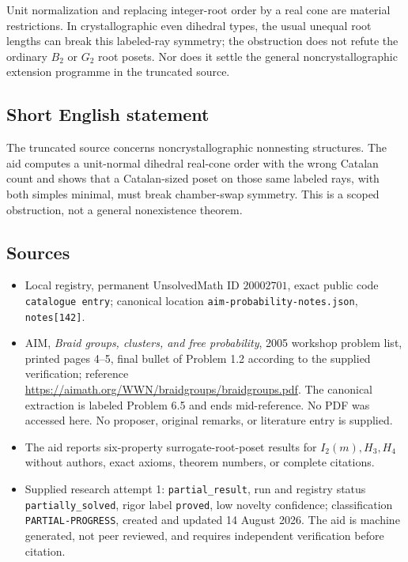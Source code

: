\documentclass[11pt]{article}
\begin{document}
Unit normalization and replacing integer-root order by a real cone are material restrictions. In crystallographic even dihedral types, the usual unequal root lengths can break this labeled-ray symmetry; the obstruction does not refute the ordinary \(B_2\) or \(G_2\) root posets. Nor does it settle the general noncrystallographic extension programme in the truncated source.
\subsection{Short English statement}
The truncated source concerns noncrystallographic nonnesting structures. The aid computes a unit-normal dihedral real-cone order with the wrong Catalan count and shows that a Catalan-sized poset on those same labeled rays, with both simples minimal, must break chamber-swap symmetry. This is a scoped obstruction, not a general nonexistence theorem.
\subsection{Sources}
\begin{itemize}
\item Local registry, permanent UnsolvedMath ID \(20002701\), exact public code \texttt{catalogue entry}; canonical location \texttt{aim-probability-notes.json}, \texttt{notes[142]}.
\item AIM, \emph{Braid groups, clusters, and free probability}, 2005 workshop problem list, printed pages 4--5, final bullet of Problem 1.2 according to the supplied verification; reference \url{https://aimath.org/WWN/braidgroups/braidgroups.pdf}. The canonical extraction is labeled Problem 6.5 and ends mid-reference. No PDF was accessed here. No proposer, original remarks, or literature entry is supplied.
\item The aid reports six-property surrogate-root-poset results for \(I_2(m),H_3,H_4\) without authors, exact axioms, theorem numbers, or complete citations.
\item Supplied research attempt 1: \texttt{partial\_result}, run and registry status \texttt{partially\_solved}, rigor label \texttt{proved}, low novelty confidence; classification \texttt{PARTIAL-PROGRESS}, created and updated 14 August 2026. The aid is machine generated, not peer reviewed, and requires independent verification before citation.
\end{itemize}
\end{document}

